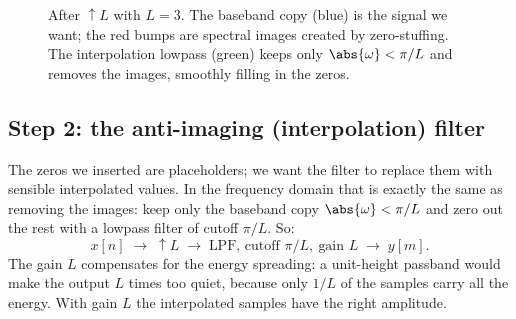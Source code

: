 \begin{figure}[H]
\centering
{}
\caption{After $\uparrow L$ with $L=3$. The baseband copy (blue) is the signal we
want; the red bumps are spectral images created by zero-stuffing. The
interpolation lowpass (green) keeps only $\abs{\omega}<\pi/L$ and removes the
images, smoothly filling in the zeros.}
\label{ch22:fig-images}
\end{figure}

\subsection{Step 2: the anti-imaging (interpolation) filter}

The zeros we inserted are placeholders; we want the filter to replace them with
sensible interpolated values. In the frequency domain that is exactly the same as
removing the images: keep only the baseband copy $\abs{\omega} < \pi/L$ and zero
out the rest with a lowpass filter of cutoff $\pi/L$. So:
\begin{equation}
  x[n] \;\longrightarrow\; \boxed{\uparrow L} \;\longrightarrow\;
  \boxed{\text{LPF, cutoff } \pi/L,\ \text{gain } L} \;\longrightarrow\; y[m].
  \label{ch22:interpchain}
\end{equation}
The gain $L$ compensates for the energy spreading: a unit-height passband would
make the output $L$ times too quiet, because only $1/L$ of the samples carry all
the energy. With gain $L$ the interpolated samples have the right amplitude.

